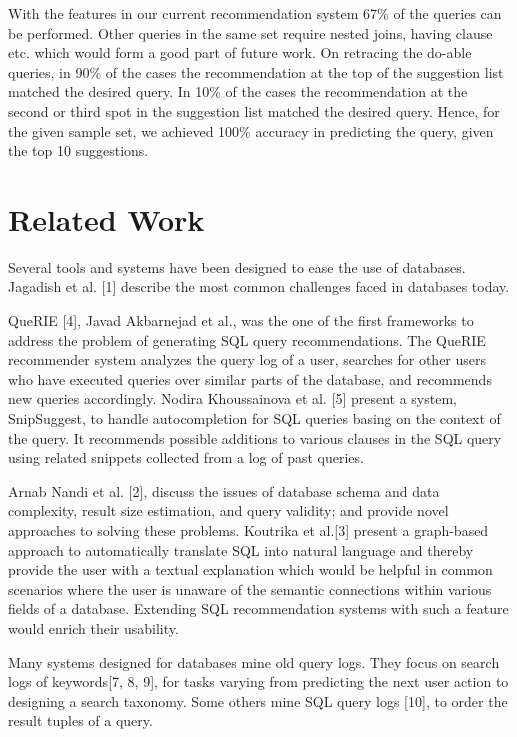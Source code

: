 \documentclass{acm_proc_article-sp}
\begin{document}
With the features in our current recommendation system 67\% of the queries can be performed. Other queries in the same set require nested joins, having clause etc. which would form a good part of future work. On retracing the do-able queries, in 90\% of the cases the recommendation at the top of the suggestion list matched the desired query. In 10\% of the cases the recommendation at the second or third spot in the suggestion list matched the desired query. Hence, for the given sample set, we achieved 100\% accuracy in predicting the query, given the top 10 suggestions.

\section{Related Work}
Several tools and systems have been designed to ease the use of databases. Jagadish et al. [1] describe the most common challenges faced in databases today.

QueRIE [4], Javad Akbarnejad et al., was the one of the first frameworks to address the problem of generating SQL query recommendations. The QueRIE recommender system analyzes the query log of a user, searches for other users who have executed queries over similar parts of the database, and recommends new queries accordingly. 
Nodira Khoussainova et al. [5] present a system, SnipSuggest, to handle autocompletion for SQL queries basing on the context of the query.  It recommends possible additions to various clauses in the SQL query using related snippets collected from a log of past queries. 

Arnab Nandi et al. [2], discuss the issues of database schema and data complexity, result size estimation, and query validity; and provide novel approaches to solving these problems. Koutrika et al.[3] present a graph-based approach to automatically translate SQL into natural language and thereby provide the user with a textual explanation which would be helpful in common scenarios where the user is unaware of the semantic connections within various fields of a database. Extending SQL recommendation systems with such a feature would enrich their usability.

Many systems designed for databases mine old query logs. They focus on search logs of keywords[7, 8, 9], for tasks varying from predicting the next user action to designing a search taxonomy. Some others mine SQL query logs [10], to order the result tuples of a query. 
\end{document}
